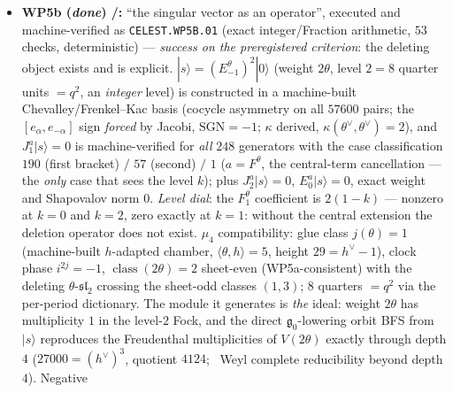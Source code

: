 \documentclass[11pt,a4paper]{article}
\begin{document}
\begin{itemize}
\begin{itemize}
$(0,\tfrac12,1,1)$ that can\emph{not} fuse into one local character; only $P=4=|\mu_4|$ periodisation
reproduces the $248$ layer; swapped glue breaks the zero-mode anchor. \emph{Honest limit} \mO: the
limit does \emph{not} generate the truncation (the loop Fock counts $897266\gg248$ at integer level
$1$) --- WP5a fixes the ideal's \emph{size and location} quantitatively and gives the celestial route
the same two-step shape as MMST (limit $+$ maximal ideal); the operator content is exactly WP5b--e,
of which WP5b--WP5d and the WP5e $\alpha$, $\beta$, $\gamma$, $\delta_2$ and $\varepsilon_2$ stages are executed below.
\item \textbf{WP5b (\emph{done}) \mE/\mC:} ``the singular vector as an operator'', executed and
machine-verified as \texttt{CELEST.WP5B.01}  (exact
integer/Fraction arithmetic, $53$ checks, deterministic) --- \emph{success on the preregistered
criterion}: the deleting object exists and is explicit.
$|s\rangle=(E^\theta_{-1})^2|0\rangle$ (weight $2\theta$, level $2=8$ quarter units $=q^2$, an
\emph{integer} level) is constructed in a machine-built Chevalley/Frenkel--Kac basis (cocycle asymmetry
on all $57600$ pairs; the $[e_\alpha,e_{-\alpha}]$ sign \emph{forced} by Jacobi, $\mathrm{SGN}=-1$;
$\kappa$ derived, $\kappa(\theta^\vee,\theta^\vee)=2$), and $J^a_1|s\rangle=0$ is machine-verified for
\emph{all} $248$ generators with the case classification $190$ (first bracket) $/$ $57$ (second) $/$
$1$ ($a=F^\theta$, the central-term cancellation --- the \emph{only} case that sees the level $k$);
plus $J^a_2|s\rangle=0$, $E^a_0|s\rangle=0$, exact weight and Shapovalov norm $0$.
\emph{Level dial}: the $F^\theta_1$ coefficient is $2(1{-}k)$ --- nonzero at $k{=}0$ and $k{=}2$, zero
exactly at $k{=}1$: without the central extension the deletion operator does not exist.
$\mu_4$ compatibility: glue class $j(\theta)=1$ (machine-built $h$-adapted chamber,
$\langle\theta,h\rangle=5$, height $29=h^\vee{-}1$), clock phase $i^{2j}=-1$,
$\operatorname{class}(2\theta)=2$ sheet-even (WP5a-consistent) with the deleting
$\theta$-$\mathfrak{sl}_2$ crossing the sheet-odd classes $(1,3)$; $8$ quarters $=q^2$ via the
per-period dictionary. The module it generates is \emph{the} ideal: weight $2\theta$ has multiplicity
$1$ in the level-$2$ Fock, and the direct $\mathfrak g_0$-lowering orbit BFS from $|s\rangle$
reproduces the Freudenthal multiplicities of $V(2\theta)$ exactly through depth $4$
($27000=(h^\vee)^3$, quotient $4124$; \mC\ Weyl complete reducibility beyond depth $4$). Negative

\end{itemize}
\end{itemize}
\end{document}
